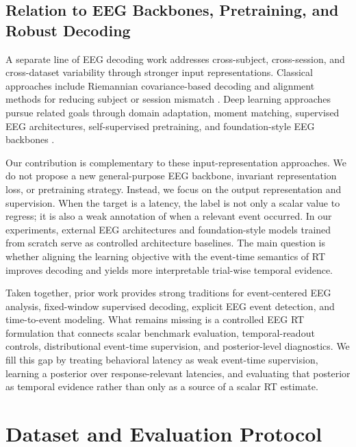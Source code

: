 \documentclass[12pt]{article}
\begin{document}
\subsection{Relation to EEG Backbones, Pretraining, and Robust Decoding}
A separate line of EEG decoding work addresses cross-subject, cross-session, and cross-dataset variability through stronger input representations. Classical approaches include Riemannian covariance-based decoding and alignment methods for reducing subject or session mismatch \citep{Barachant2012RiemannianBCI,Jayaram2016TransferLearningBCI,Zanini2018RiemannianTL,HeWu2020EuclideanAlignment}. Deep learning approaches pursue related goals through domain adaptation, moment matching, supervised EEG architectures, self-supervised pretraining, and foundation-style EEG backbones \citep{Ganin2016DANN,SunSaenko2016DeepCORAL,Kostas2021BENDR,wang2024eegpt,Jiang2024LaBraM,Chen2024EEGFormer,Wang2025EEGMamba,ElOuahidi2025REVE,Yue2024BrainGPT}.

Our contribution is complementary to these input-representation approaches. We do not propose a new general-purpose EEG backbone, invariant representation loss, or pretraining strategy. Instead, we focus on the output representation and supervision. When the target is a latency, the label is not only a scalar value to regress; it is also a weak annotation of when a relevant event occurred. In our experiments, external EEG architectures and foundation-style models trained from scratch serve as controlled architecture baselines. The main question is whether aligning the learning objective with the event-time semantics of RT improves decoding and yields more interpretable trial-wise temporal evidence.

Taken together, prior work provides strong traditions for event-centered EEG analysis, fixed-window supervised decoding, explicit EEG event detection, and time-to-event modeling. What remains missing is a controlled EEG RT formulation that connects scalar benchmark evaluation, temporal-readout controls, distributional event-time supervision, and posterior-level diagnostics. We fill this gap by treating behavioral latency as weak event-time supervision, learning a posterior over response-relevant latencies, and evaluating that posterior as temporal evidence rather than only as a source of a scalar RT estimate.


\section{Dataset and Evaluation Protocol}
\end{document}
